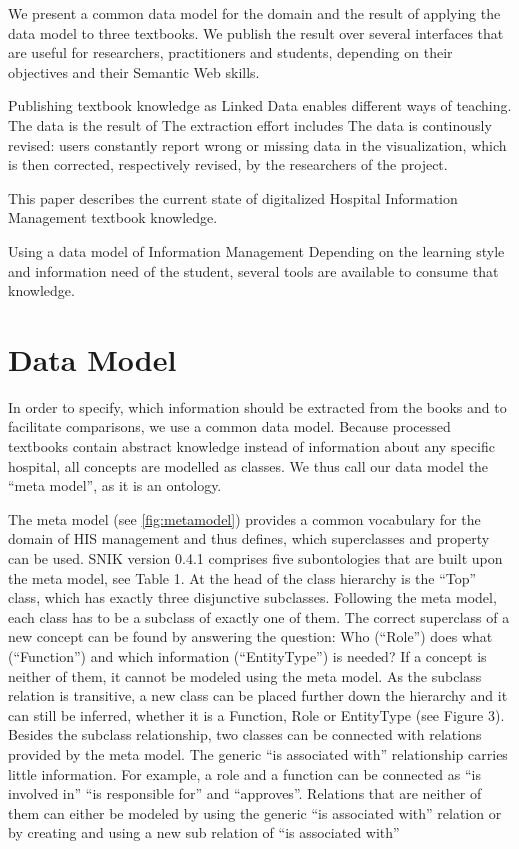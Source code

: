 \documentclass[sw]{iosart2x}
\begin{document}
We present a common data model for the domain and the result of applying the data model to three textbooks.
We publish the result over several interfaces that are useful for researchers, practitioners and students, depending on their objectives and their Semantic Web skills.

Publishing textbook knowledge as Linked Data enables different ways of teaching.
The data is the result of 
The extraction effort includes 
The data is continously revised: users constantly report wrong or missing data in the visualization, which is then corrected, respectively revised, by the researchers of the project.

This paper describes the current state of digitalized Hospital Information Management textbook knowledge.

Using a data model of Information Management 
Depending on the learning style and information need of the student, several tools are available to consume that knowledge.

\section{Data Model}
In order to specify, which information should be extracted from the books and to facilitate comparisons, we use a common data model.
Because processed textbooks contain abstract knowledge instead of information about any specific hospital, all concepts are modelled as classes.
We thus call our data model the \enquote{meta model}, as it is an ontology.

The meta model (see \cref{fig:metamodel}) provides a common vocabulary for the domain of HIS management and thus defines, which superclasses and property can be used.
SNIK version 0.4.1 comprises five subontologies that are built upon the meta model, see Table 1.
At the head of the class hierarchy is the \enquote{Top} class, which has exactly three disjunctive subclasses.
Following the meta model, each class has to be a subclass of exactly one of them.
The correct superclass of a new concept can be found by answering the question: Who (\enquote{Role}) does what (\enquote{Function}) and which information (\enquote{EntityType}) is needed? If a concept is neither of them, it cannot be modeled using the meta model.
As the subclass relation is transitive, a new class can be placed further down the hierarchy and it can still be inferred, whether it is a Function, Role or EntityType (see Figure 3).
Besides the subclass relationship, two classes can be connected with relations provided by the meta model.
The generic \enquote{is associated with} relationship carries little information.
For example, a role and a function can be connected as \enquote{is involved in} \enquote{is responsible for} and \enquote{approves}.
Relations that are neither of them can either be modeled by using the generic \enquote{is associated with} relation or by creating and using a new sub relation of \enquote{is associated with}
\end{document}
